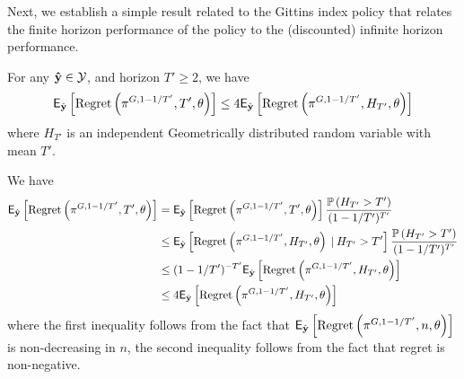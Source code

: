 {Next, we establish a simple result related to the Gittins index policy that relates the finite horizon performance of the policy to the (discounted) infinite horizon performance. 

\begin{lemma}
\label{lemma:gittinsfiniteinfinite}
For any $\mathbf{\hat y} \in \mathcal Y$, and horizon $T' \geq 2$, we have
\[
\mathsf{E}
_{\hat{\mathbf y}}
\left[
{\rm Regret}\left(
\pi^{G,1-1/{T'}}, T',\theta
\right)
\right]
\leq
4
\mathsf{E}
_{\hat{\mathbf y}}
\left[
{\rm Regret}\left(
\pi^{G,1-1/{T'}}, H_{T'},\theta
\right)
\right]
\]
where $H_{T'}$ is an independent Geometrically distributed random variable with mean $T'$. 
\end{lemma}
\begin{myproof}[Proof.]
We have
\[
\begin{split}
\mathsf{E}_{\hat{\mathbf y}}\left[\textnormal{Regret} \left( \pi^{G, 1-1/{T'}}, T', \theta \right)\right]  
& = 
\mathsf{E}_{\hat{\mathbf y}}\left[\textnormal{Regret} \left( \pi^{G, 1-1/{T'}}, T', \theta \right)\right]\frac{\mathbb{P} \left( H_{T'} > T' \right)}{(1 - 1/{T'})^{T'}}
\\
& \leq
\mathsf{E}_{\hat{\mathbf y}}\left[\textnormal{Regret} \left( \pi^{G, 1-1/{T'}}, H_{T'}, \theta \right) \:\vert\: H_{T'} > T'\right]\frac{\mathbb{P} \left( H_{T'} > T' \right) }{(1 - 1/{T'})^{T'}}
\\ 
& \leq
{(1 - 1/{T'})^{-T'}} \mathsf{E}_{\hat{\mathbf y}}\left[\textnormal{Regret} \left( \pi^{G, 1-1/{T'}}, H_{T'}, \theta \right)\right]
\\
& \leq
4 \mathsf{E}_{\hat{\mathbf y}}\left[\textnormal{Regret} \left( \pi^{G, 1-1/{T'}}, H_{T'}, \theta \right)\right]
\end{split}
\]
where the first inequality follows from the fact that $\mathsf{E}_{\hat{\mathbf y}}\left[\textnormal{Regret} \left( \pi^{G, 1-1/{T'}}, n, \theta \right)\right]$ is non-decreasing in $n$, the second inequality follows from the fact that regret is non-negative. 
\end{myproof}

}
